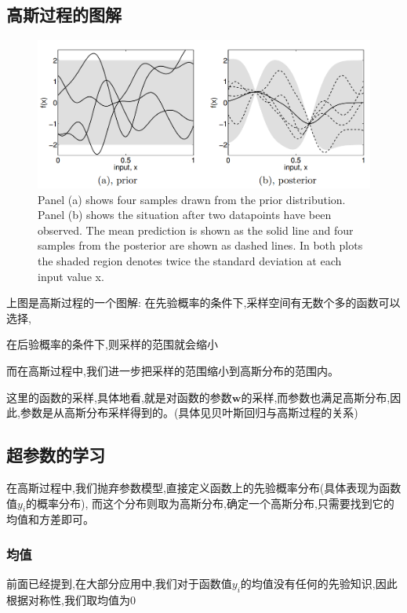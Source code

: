 \documentclass[UTF8,a4paper]{ctexart}
\begin{document}
        \subsection{高斯过程的图解}
        \begin{figure}[H]
            \centering
            \includegraphics[scale = 0.45]{assets/GaussianProcess_2a664.png}
            \caption{Panel (a) shows four samples drawn from the prior distribution. Panel
(b) shows the situation after two datapoints have been observed. The mean prediction
is shown as the solid line and four samples from the posterior are shown as dashed
lines. In both plots the shaded region denotes twice the standard deviation at each
input value x.}
        \end{figure}
        上图是高斯过程的一个图解:
        在先验概率的条件下,采样空间有无数个多的函数可以选择,

        在后验概率的条件下,则采样的范围就会缩小

        而在高斯过程中,我们进一步把采样的范围缩小到高斯分布的范围内。

        {\color{blue}这里的函数的采样,具体地看,就是对函数的参数$\bm w$的采样,而参数也满足高斯分布,因此,参数是从高斯分布采样得到的。(具体见贝叶斯回归与高斯过程的关系)}

        \subsection{超参数的学习}
        在高斯过程中,我们抛弃参数模型,直接定义函数上的先验概率分布({\color{blue}具体表现为函数值$y_i$的概率分布}),
        而这个分布则取为高斯分布,确定一个高斯分布,只需要找到它的均值和方差即可。
            \subsubsection{均值}
            前面已经提到,在大部分应用中,我们对于函数值$y_i$的均值没有任何的先验知识,因此根据对称性,我们取均值为$0$
\end{document}
